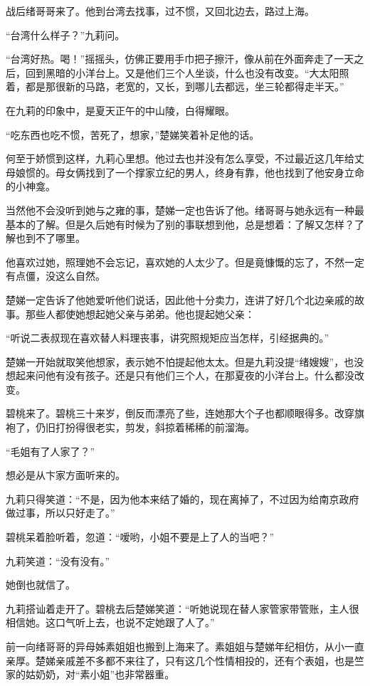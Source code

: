 \par 战后绪哥哥来了。他到台湾去找事，过不惯，又回北边去，路过上海。
\par “台湾什么样子？”九莉问。
\par “台湾好热。喝！”摇摇头，仿佛正要用手巾把子擦汗，像从前在外面奔走了一天之后，回到黑暗的小洋台上。又是他们三个人坐谈，什么也没有改变。“大太阳照着，都是那很新的马路，老宽的，又长，到哪儿去都远，坐三轮都得走半天。”
\par 在九莉的印象中，是夏天正午的中山陵，白得耀眼。
\par “吃东西也吃不惯，苦死了，想家，”楚娣笑着补足他的话。
\par 何至于娇惯到这样，九莉心里想。他过去也并没有怎么享受，不过最近这几年给丈母娘惯的。母女俩找到了一个撑家立纪的男人，终身有靠，他也找到了他安身立命的小神龛。
\par 当然他不会没听到她与之雍的事，楚娣一定也告诉了他。绪哥哥与她永远有一种最基本的了解。但是久后她有时候为了别的事联想到他，总是想着：了解又怎样？了解也到不了哪里。
\par 他喜欢过她，照理她不会忘记，喜欢她的人太少了。但是竟慷慨的忘了，不然一定有点僵，没这么自然。
\par 楚娣一定告诉了他她爱听他们说话，因此他十分卖力，连讲了好几个北边亲戚的故事。那些人都使她想起她父亲与弟弟。他也提起她父亲：
\par “听说二表叔现在喜欢替人料理丧事，讲究照规矩应当怎样，引经据典的。”
\par 楚娣一开始就取笑他想家，表示她不怕提起他太太。但是九莉没提“绪嫂嫂”，也没想起来问他有没有孩子。还是只有他们三个人，在那夏夜的小洋台上。什么都没改变。
\par 碧桃来了。碧桃三十来岁，倒反而漂亮了些，连她那大个子也都顺眼得多。改穿旗袍了，仍旧打扮得很老实，剪发，斜掠着稀稀的前溜海。
\par “毛姐有了人家了？”
\par 想必是从卞家方面听来的。
\par 九莉只得笑道：“不是，因为他本来结了婚的，现在离掉了，不过因为给南京政府做过事，所以只好走了。”
\par 碧桃呆着脸听着，忽道：“嗳哟，小姐不要是上了人的当吧？”
\par 九莉笑道：“没有没有。”
\par 她倒也就信了。
\par 九莉搭讪着走开了。碧桃去后楚娣笑道：“听她说现在替人家管家带管账，主人很相信她。这口气听上去，也说不定她跟了人了。”
\par 前一向绪哥哥的异母姊素姐姐也搬到上海来了。素姐姐与楚娣年纪相仿，从小一直亲厚。楚娣亲戚差不多都不来往了，只有这几个性情相投的，还有个表姐，也是竺家的姑奶奶，对“素小姐”也非常器重。
